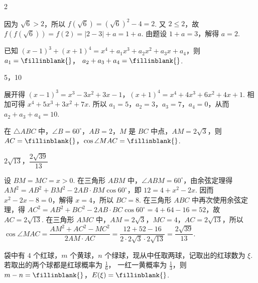 \begin{answer}
2
\end{answer}

\begin{solution}
因为 \(\sqrt6>2\)，所以 \(f(\sqrt6)=(\sqrt6)^{2}-4=2\). 又 \(2\leq2\)，故 \(f(f(\sqrt6))=f(2)=|2-3|+a=1+a\). 由题设 \(1+a=3\)，解得 \(a=2\).
\end{solution}

\begin{problem}
已知
\((x-1)^3+(x+1)^4=x^4+a_1x^3+a_2x^2+a_3x+a_4\)，则
\(a_1=\fillinblank{}\)，
\(a_2+a_3+a_4=\fillinblank{}\).
\end{problem}

\begin{answer}
5，10
\end{answer}

\begin{solution}
展开得 \((x-1)^{3}=x^{3}-3x^{2}+3x-1\)，\((x+1)^{4}=x^{4}+4x^{3}+6x^{2}+4x+1\). 相加可得
\(x^{4}+5x^{3}+3x^{2}+7x\). 所以 \(a_{1}=5\)，\(a_{2}=3\)，\(a_{3}=7\)，\(a_{4}=0\)，从而 \(a_{2}+a_{3}+a_{4}=10\).
\end{solution}

\begin{problem}
在 \(\triangle ABC\) 中，\(\angle B=60^\circ\)，\(AB=2\)，\(M\) 是 \(BC\) 中点，\(AM=2\sqrt{3}\)，则
\(AC=\fillinblank{}\)，\(\cos\angle MAC=\fillinblank{}\).

\end{problem}

\begin{answer}
\(2\sqrt{13}\)，\(\dfrac{2\sqrt{39}}{13}\)
\end{answer}

\begin{solution}
设 \(BM=MC=x>0\). 在三角形 \(ABM\) 中，\(\angle ABM=60^{\circ}\)，由余弦定理得
\(AM^{2}=AB^{2}+BM^{2}-2AB\cdot BM\cos60^{\circ}\)，即 \(12=4+x^{2}-2x\). 因而 \(x^{2}-2x-8=0\)，解得 \(x=4\)，所以 \(BC=8\).
在三角形 \(ABC\) 中再次使用余弦定理，得
\(AC^{2}=AB^{2}+BC^{2}-2AB\cdot BC\cos60^{\circ}=4+64-16=52\)，故 \(AC=2\sqrt{13}\).
在三角形 \(AMC\) 中，\(AM=2\sqrt3\)，\(MC=4\)，\(AC=2\sqrt{13}\)，所以
\(\cos\angle MAC=\dfrac{AM^{2}+AC^{2}-MC^{2}}{2AM\cdot AC}=\dfrac{12+52-16}{2\cdot2\sqrt3\cdot2\sqrt{13}}=\dfrac{2\sqrt{39}}{13}\).
\end{solution}

\begin{problem}
袋中有 \(4\) 个红球，\(m\) 个黄球，\(n\) 个绿球，现从中任取两球，记取出的红球数为 \(\xi\).
若取出的两个球都是红球概率为 \(\frac{1}{6}\)，
一红一黄概率为 \(\frac{1}{3}\)，则
\(m-n=\fillinblank{}\)，\(E(\xi)=\fillinblank{}\).
\end{problem}

